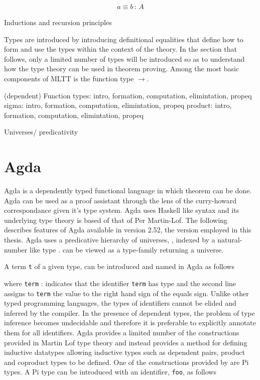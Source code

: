 \begin{align*}
    a \equiv b \, : \, A
\end{align*}

Inductions and recursion principles


Types are introduced by introducing definitional equalities that define how to
form and use the types within the context of the theory. In the section that
follows, only a limited number of types will be introduced so as to understand
how the type theory can be used in theorem proving. Among the most basic
components of MLTT is the function type $\rightarrow$.

(dependent) Function types: intro, formation, computation, elimintation, propeq
sigma: intro, formation, computation, elimintation, propeq
product: intro, formation, computation, elimintation, propeq

Universes/ predicativity

\section{Agda}

Agda is a dependently typed functional language in which theorem can be done.
Agda can be used as a proof assistant through the lens of the curry-howard
correspondance given it's type system. Agda uses Haskell like syntax and its
underlying type theory is based of that of Per Martin-Lof. The following
describes features of Agda available in version 2.52, the version employed in
this thesis. Agda uses a predicative hierarchy of universes,
, indexed by a natural-number like type
.  can be viewed as a type-family
returning a universe.

A term \verb|t| of a given type,  can be introduced and named
in Agda as follows


where \verb|term| :  indicates that the identifier \verb|term| has
type  and the second line assigns to \verb|term| the value to
the right hand sign of the equals sign. Unlike other typed programming
languages, the types of identifiers cannot be elided and inferred by the
compiler. In the presence of dependent types, the problem of type inference
becomes undecidable and therefore it is preferable to explicitly annotate them
for all identifiers. Agda provides a limited number of the constructions
provided in Martin Lof type theory and instead provides a method for defining
inductive datatypes allowing inductive types such as dependent pairs, product
and coproduct types to be defined. One of the constructions provided by
are Pi types. A Pi type can be introduced with an identifier, \verb|foo|, as follows

